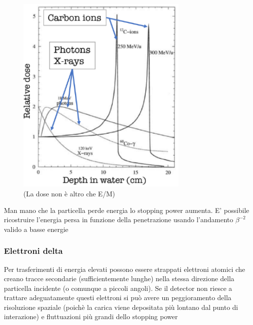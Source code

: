 \begin{minipage}{0.48\textwidth}
    \begin{figure}[H]
        \centering
        \includegraphics[width=0.75\textwidth,frame]{Chapters/images/Interazione_radiazione_materia/image-20220214183616196.png}
        \captionsetup{width=\textwidth}
        \caption{(La dose non è altro che E/M)}
        \label{fig:braggpeak}
    \end{figure}
\end{minipage} \hfill
\begin{minipage}{0.48\textwidth}
    Man mano che la particella perde energia lo stopping power aumenta. E' possibile ricostruire l'energia persa in funzione della penetrazione usando l'andamento $\beta^{-2}$ valido a basse energie

\end{minipage}

\subsubsection*{Elettroni delta}
Per trasferimenti di energia elevati possono essere strappati elettroni atomici che creano tracce secondarie (sufficientemente lunghe) nella stessa direzione della particella incidente (o comunque a piccoli angoli).
Se il detector non riesce a trattare adeguatamente questi elettroni si può avere un peggioramento della risoluzione spaziale (poichè la carica viene depositata più lontano dal punto di interazione) e fluttuazioni più grandi dello stopping power

